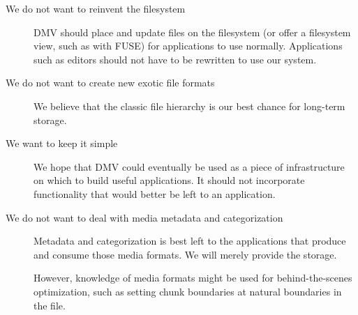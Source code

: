 \begin{description}

    \item[We do not want to reinvent the filesystem] DMV should place and update
        files on the filesystem (or offer a filesystem view, such as with FUSE)
        for applications to use normally. Applications such as editors should
        not have to be rewritten to use our system.

  \item[We do not want to create new exotic file formats] We believe that the
      classic file hierarchy is our best chance for long-term storage.

  \item[We want to keep it simple] We hope that DMV could eventually be used as
      a piece of infrastructure on which to build useful applications. It should
      not incorporate functionality that would better be left to an application.

  \item[We do not want to deal with media metadata and categorization] Metadata
      and categorization is best left to the applications that produce and
      consume those media formats. We will merely provide the storage.

      However, knowledge of media formats might be used for behind-the-scenes
      optimization, such as setting chunk boundaries at natural boundaries in
      the file.

\end{description}
